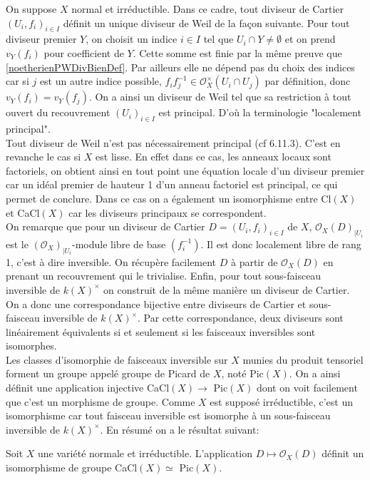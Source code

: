On suppose $X$ normal et irréductible. Dans ce cadre, tout diviseur de Cartier $(U_i, f_i)_{i\in I}$ définit un unique diviseur de Weil de la façon suivante. Pour tout diviseur  premier $Y$, on choisit un indice $i\in I$ tel que $U_i\cap Y\neq \emptyset$ et on prend $v_Y(f_i)$ pour coefficient de $Y$. Cette somme est finie par la même preuve que \ref{noetherienPWDivBienDef}. Par ailleurs elle ne dépend pas du choix des indices car si $j$ est un autre indice possible, $f_if_j^{-1}\in \mathcal{O}_X^\times(U_i\cap U_j)$ par définition, donc $v_Y(f_i)=v_Y(f_j)$. On a ainsi un diviseur de Weil tel que sa restriction à tout ouvert du recouvrement $(U_i)_{i\in I}$ est principal. D'où la terminologie "localement principal".\\ 
Tout diviseur de Weil n'est pas nécessairement principal (cf \cite{Hartshorne} 6.11.3). C'est en revanche le cas si $X$ est lisse. En effet dans ce cas, les anneaux locaux sont factoriels, on obtient ainsi en tout point une équation locale d'un diviseur premier car un idéal premier de hauteur 1 d'un anneau factoriel est principal, ce qui permet de conclure. Dans ce cas on a également un isomorphisme entre Cl$(X)$ et CaCl$(X)$ car les diviseurs principaux se correspondent.\\
On remarque que pour un diviseur de Cartier $D=(U_i, f_i)_{i\in I}$ de $X$, $\mathcal{O}_X(D)_{|U_i}$ est le $(\mathcal{O}_X)_{|U_i}$-module libre de base $(f_i^{-1})$. Il est donc localement libre de rang 1, c'est à dire inversible. On récupère facilement $D$ à partir de $\mathcal{O}_X(D)$ en prenant un recouvrement qui le trivialise. Enfin, pour tout sous-faisceau inversible de $k(X)^\times$ on construit de la même manière un diviseur de Cartier. On a donc une correspondance bijective entre diviseurs de Cartier et sous-faisceau inversible de $k(X)^\times$. Par cette correspondance, deux diviseurs sont linéairement équivalents si et seulement si les faisceaux inversibles sont isomorphes.\\
Les classes d'isomorphie de faisceaux inversible sur $X$ munies du produit tensoriel forment un groupe appelé groupe de Picard de $X$, noté Pic$(X)$. On a ainsi définit une application injective CaCl$(X)\rightarrow$ Pic$(X)$ dont on voit facilement que c'est un morphisme de groupe. Comme $X$ est supposé irréductible, c'est un isomorphisme car tout faisceau inversible est isomorphe à un sous-faisceau inversible de $k(X)^\times$. En résumé on a le résultat suivant:

\begin{prop}
Soit $X$ une variété normale et irréductible. L'application $D\mapsto \mathcal{O}_X(D)$ définit un isomorphisme de groupe CaCl$(X)\simeq $ Pic$(X)$.
\end{prop}

